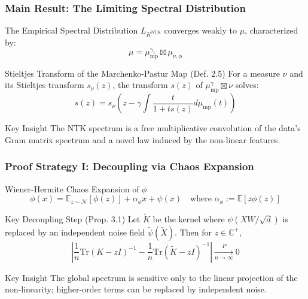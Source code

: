 \documentclass[10pt]{beamer}
\begin{document}
\begin{frame}
    \frametitle{Main Result: The Limiting Spectral Distribution}
    \begin{theorem}[Thm. 2.7]
        The Empirical Spectral Distribution $L_{K^{\text{NTK}}}$ converges weakly to $\mu$, characterized by:
        \begin{equation*}
            \mu = \mu_{\text{mp}}^{\gamma_1} \boxtimes \mu_{\nu, \phi}
        \end{equation*}
    \end{theorem}
    \begin{block}{Stieltjes Transform of the Marchenko-Pastur Map (Def. 2.5)}
        For a measure $\nu$ and its Stieltjes transform $s_\nu(z)$, the transform $s(z)$ of $\mu_{\text{mp}}^\gamma \boxtimes \nu$ solves:
        \begin{equation*}
            s(z) = s_\nu\left(z - \gamma \int \frac{t}{1+ts(z)} d\mu_{\text{mp}}(t) \right)
        \end{equation*}
    \end{block}
    \begin{alertblock}{Key Insight}
    The NTK spectrum is a free multiplicative convolution of the data's Gram matrix spectrum and a novel law induced by the non-linear features.
    \end{alertblock}
\end{frame}

\begin{frame}
    \frametitle{Proof Strategy I: Decoupling via Chaos Expansion}
    \begin{block}{Wiener-Hermite Chaos Expansion of $\phi$}
        \begin{equation*}
            \phi(x) = \mathbb{E}_{z \sim \mathcal{N}}[\phi(z)] + \alpha_\phi x + \psi(x) \quad \text{where } \alpha_\phi := \mathbb{E}[z\phi(z)]
        \end{equation*}
    \end{block}
    \begin{exampleblock}{Key Decoupling Step (Prop. 3.1)}
        Let $\tilde{K}$ be the kernel where $\psi(XW/\sqrt{d})$ is replaced by an independent noise field $\tilde{\psi}(\tilde{X})$. Then for $z \in \mathbb{C}^+$,
        \begin{equation*}
            \left| \frac{1}{n}\text{Tr}(K-zI)^{-1} - \frac{1}{n}\text{Tr}(\tilde{K}-zI)^{-1} \right| \xrightarrow[n\to\infty]{P} 0
        \end{equation*}
    \end{exampleblock}
    \begin{alertblock}{Key Insight}
    The global spectrum is sensitive only to the linear projection of the non-linearity; higher-order terms can be replaced by independent noise.
    \end{alertblock}
\end{frame}
\end{document}
